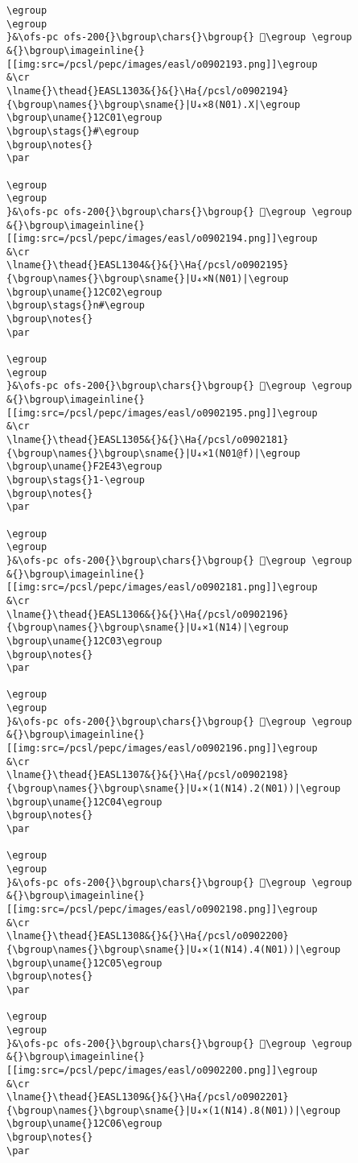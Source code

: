 \begin{verbatim}
\egroup
\egroup
}&\ofs-pc ofs-200{}\bgroup\chars{}\bgroup{} 𒰀\egroup \egroup
&{}\bgroup\imageinline{}[[img:src=/pcsl/pepc/images/easl/o0902193.png]]\egroup
&\cr
\lname{}\thead{}EASL1303&{}&{}\Ha{/pcsl/o0902194}{\bgroup\names{}\bgroup\sname{}|U₄×8(N01).X|\egroup
\bgroup\uname{}12C01\egroup
\bgroup\stags{}#\egroup
\bgroup\notes{}
\par 

\egroup
\egroup
}&\ofs-pc ofs-200{}\bgroup\chars{}\bgroup{} 𒰁\egroup \egroup
&{}\bgroup\imageinline{}[[img:src=/pcsl/pepc/images/easl/o0902194.png]]\egroup
&\cr
\lname{}\thead{}EASL1304&{}&{}\Ha{/pcsl/o0902195}{\bgroup\names{}\bgroup\sname{}|U₄×N(N01)|\egroup
\bgroup\uname{}12C02\egroup
\bgroup\stags{}n#\egroup
\bgroup\notes{}
\par 

\egroup
\egroup
}&\ofs-pc ofs-200{}\bgroup\chars{}\bgroup{} 𒰂\egroup \egroup
&{}\bgroup\imageinline{}[[img:src=/pcsl/pepc/images/easl/o0902195.png]]\egroup
&\cr
\lname{}\thead{}EASL1305&{}&{}\Ha{/pcsl/o0902181}{\bgroup\names{}\bgroup\sname{}|U₄×1(N01@f)|\egroup
\bgroup\uname{}F2E43\egroup
\bgroup\stags{}1-\egroup
\bgroup\notes{}
\par 

\egroup
\egroup
}&\ofs-pc ofs-200{}\bgroup\chars{}\bgroup{} 󲹃\egroup \egroup
&{}\bgroup\imageinline{}[[img:src=/pcsl/pepc/images/easl/o0902181.png]]\egroup
&\cr
\lname{}\thead{}EASL1306&{}&{}\Ha{/pcsl/o0902196}{\bgroup\names{}\bgroup\sname{}|U₄×1(N14)|\egroup
\bgroup\uname{}12C03\egroup
\bgroup\notes{}
\par 

\egroup
\egroup
}&\ofs-pc ofs-200{}\bgroup\chars{}\bgroup{} 𒰃\egroup \egroup
&{}\bgroup\imageinline{}[[img:src=/pcsl/pepc/images/easl/o0902196.png]]\egroup
&\cr
\lname{}\thead{}EASL1307&{}&{}\Ha{/pcsl/o0902198}{\bgroup\names{}\bgroup\sname{}|U₄×(1(N14).2(N01))|\egroup
\bgroup\uname{}12C04\egroup
\bgroup\notes{}
\par 

\egroup
\egroup
}&\ofs-pc ofs-200{}\bgroup\chars{}\bgroup{} 𒰄\egroup \egroup
&{}\bgroup\imageinline{}[[img:src=/pcsl/pepc/images/easl/o0902198.png]]\egroup
&\cr
\lname{}\thead{}EASL1308&{}&{}\Ha{/pcsl/o0902200}{\bgroup\names{}\bgroup\sname{}|U₄×(1(N14).4(N01))|\egroup
\bgroup\uname{}12C05\egroup
\bgroup\notes{}
\par 

\egroup
\egroup
}&\ofs-pc ofs-200{}\bgroup\chars{}\bgroup{} 𒰅\egroup \egroup
&{}\bgroup\imageinline{}[[img:src=/pcsl/pepc/images/easl/o0902200.png]]\egroup
&\cr
\lname{}\thead{}EASL1309&{}&{}\Ha{/pcsl/o0902201}{\bgroup\names{}\bgroup\sname{}|U₄×(1(N14).8(N01))|\egroup
\bgroup\uname{}12C06\egroup
\bgroup\notes{}
\par 


\end{verbatim}
